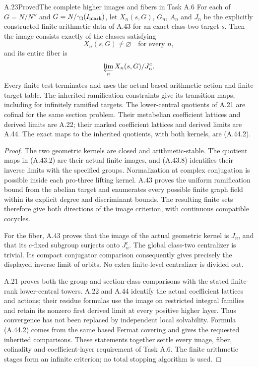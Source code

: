 \begin{statement}{A.23}{Proved}{The complete higher images and fibers in Task A.6}
For each of $G=N/N''$ and $G=N/\gamma_3(I_{\rm mark})$,
let $X_n(s,G)$, $G_n$, $A_n$ and $J_n$ be the explicitly
constructed finite arithmetic data of A.43 for an exact
class-two target $s$. Then the image consists exactly of
the classes satisfying
\[
             X_n(s,G)\ne\varnothing\quad\text{for every }n,
\]
and its entire fiber is
\[
                  \varprojlim_n X_n(s,G)/J_n^c.
\]
Every finite test terminates and uses the actual based
arithmetic action and finite target table. The inherited
ramification constraints give its transition maps, including
for infinitely ramified targets. The lower-central quotients
of A.21 are cofinal for the same section problem. Their
metabelian coefficient lattices and derived limits are A.22;
their marked coefficient lattices and derived limits are A.44.
The exact maps to the inherited quotients, with both kernels,
are (A.44.2).
\end{statement}
\begin{proof}
The two geometric kernels are closed and arithmetic-stable.
The quotient maps in (A.43.2) are their actual finite images,
and (A.43.8) identifies their inverse limits with the specified
groups. Normalization at complex conjugation is possible
inside each pro-three lifting kernel. A.43 proves the
uniform ramification bound from the abelian target and
enumerates every possible finite graph field within its
explicit degree and discriminant bounds. The resulting
finite sets therefore give both directions of the image
criterion, with continuous compatible cocycles.

For the fiber, A.43 proves that the image of the actual
geometric kernel is $J_n$, and that its $c$-fixed subgroup
surjects onto $J_n^c$. The global class-two centralizer is
trivial. Its compact conjugator comparison consequently
gives precisely the displayed inverse limit of orbits.
No extra finite-level centralizer is divided out.

A.21 proves both the group and section-class comparisons
with the stated finite-rank lower-central towers. A.22 and
A.44 identify the actual coefficient lattices and actions;
their residue formulas use the image on restricted integral
families and retain its nonzero first derived limit at every
positive higher layer. Thus convergence has not been
replaced by independent local solvability. Formula (A.44.2)
comes from the same based Fermat covering and gives the
requested inherited comparisons. These statements together
settle every image, fiber, cofinality and coefficient-layer
requirement of Task A.6. The finite arithmetic stages form
an infinite criterion; no total stopping algorithm is used.
\end{proof}

